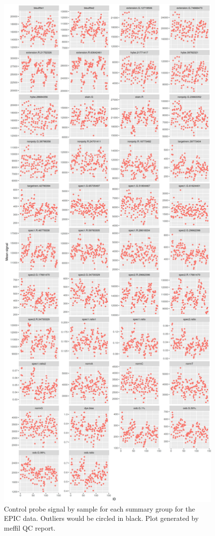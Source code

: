 \documentclass[
]{book}
\begin{document}
\begin{figure}

{\centering \includegraphics[width=0.8\linewidth]{figs/MAVIDOSqcEPICctrlProbes} 

}

\caption{Control probe signal by sample for each summary group for the EPIC data.
Outliers would be circled in black. Plot generated by meffil QC report.}\label{fig:MAVIDOSqcEPICctrlProbes}
\end{figure}
\end{document}
